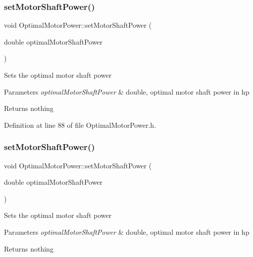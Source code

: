 \subsubsection{\texorpdfstring{set\+Motor\+Shaft\+Power()}{setMotorShaftPower()}\hspace{0.1cm}{\footnotesize\ttfamily [1/3]}}
{\footnotesize\ttfamily void Optimal\+Motor\+Power\+::set\+Motor\+Shaft\+Power (\begin{DoxyParamCaption}\item[{double}]{optimal\+Motor\+Shaft\+Power }\end{DoxyParamCaption})\hspace{0.3cm}{\ttfamily [inline]}}

Sets the optimal motor shaft power


\begin{DoxyParams}{Parameters}
{\em optimal\+Motor\+Shaft\+Power} & double, optimal motor shaft power in hp\\
\hline
\end{DoxyParams}
\begin{DoxyReturn}{Returns}
nothing 
\end{DoxyReturn}


Definition at line 88 of file Optimal\+Motor\+Power.\+h.

\mbox{\label{class_optimal_motor_power_ada8a9e3caac34c54470ad13ffe7edf53}} 
\subsubsection{\texorpdfstring{set\+Motor\+Shaft\+Power()}{setMotorShaftPower()}\hspace{0.1cm}{\footnotesize\ttfamily [2/3]}}
{\footnotesize\ttfamily void Optimal\+Motor\+Power\+::set\+Motor\+Shaft\+Power (\begin{DoxyParamCaption}\item[{double}]{optimal\+Motor\+Shaft\+Power }\end{DoxyParamCaption})\hspace{0.3cm}{\ttfamily [inline]}}

Sets the optimal motor shaft power


\begin{DoxyParams}{Parameters}
{\em optimal\+Motor\+Shaft\+Power} & double, optimal motor shaft power in hp\\
\hline
\end{DoxyParams}
\begin{DoxyReturn}{Returns}
nothing 
\end{DoxyReturn}


